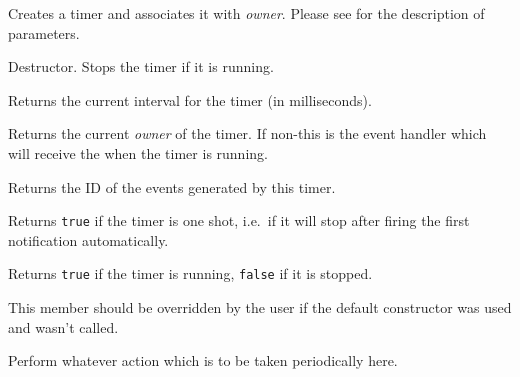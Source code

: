 
Creates a timer and associates it with {\it owner}. Please see 
 for the description of parameters.

\label{wxtimerdtor}


Destructor. Stops the timer if it is running.

\label{wxtimergetinterval}


Returns the current interval for the timer (in milliseconds).

\label{wxtimergetowner}


Returns the current {\it owner} of the timer.
If non-\NULL this is the event handler which will receive the 
 when the timer is running.

\label{wxtimergetid}


Returns the ID of the events generated by this timer.

\label{wxtimerisoneshot}


Returns {\tt true} if the timer is one shot, i.e.\ if it will stop after firing the
first notification automatically.

\label{wxtimerisrunning}


Returns {\tt true} if the timer is running, {\tt false} if it is stopped.

\label{wxtimernotify}


This member should be overridden by the user if the default constructor was
used and  wasn't called.

Perform whatever action which is to be taken periodically here.

\label{wxtimersetowner}

